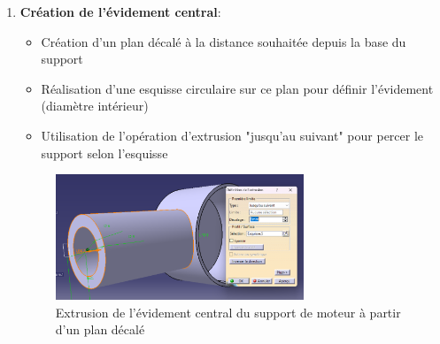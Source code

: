 \documentclass[a4paper,12pt]{report}
\begin{document}
\begin{enumerate}
    \item \textbf{Création de l'évidement central}:
    \begin{itemize}
        \item Création d'un plan décalé à la distance souhaitée depuis la base du support
        \item Réalisation d'une esquisse circulaire sur ce plan pour définir l'évidement (diamètre intérieur)
        \item Utilisation de l'opération d'extrusion "jusqu'au suivant" pour percer le support selon l'esquisse
    \end{itemize}
    \begin{figure}[H]
        \centering
        \includegraphics[width=0.7\textwidth]{images/extrusion_evidement_support.png}
        \caption{Extrusion de l'évidement central du support de moteur à partir d'un plan décalé}
        \label{fig:extrusion_evidement_support}
    \end{figure}
    

\end{enumerate}
\end{document}
